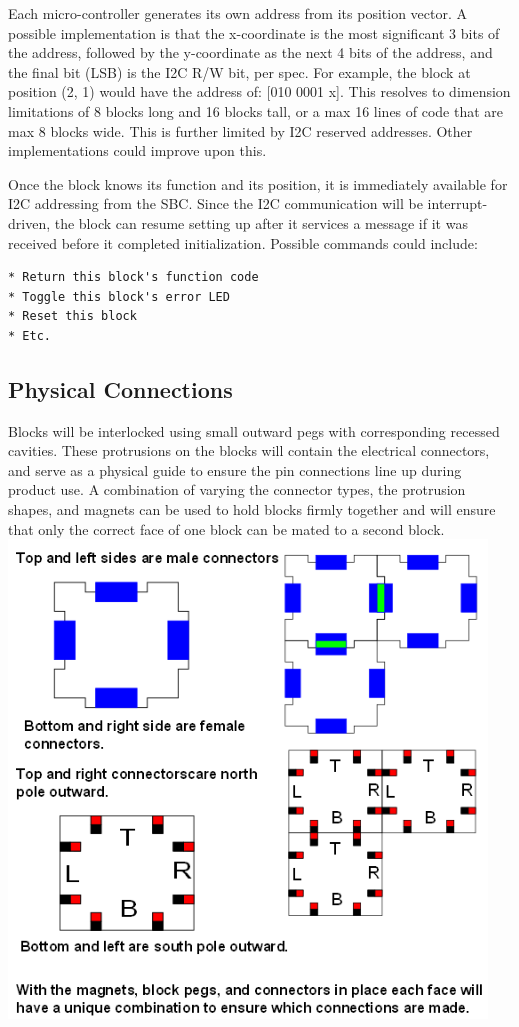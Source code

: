 Each micro-controller generates its own address from its position vector. A possible implementation is that the x-coordinate is the most significant 3 bits of the address, followed by the y-coordinate as the next 4 bits of the address, and the final bit (LSB) is the I2C R/W bit, per spec. For example, the block at position (2, 1) would have the address of: [010 0001 x]. This resolves to dimension limitations of 8 blocks long and 16 blocks tall, or a max 16 lines of code that are max 8 blocks wide. This is further limited by I2C reserved addresses. Other implementations could improve upon this.


Once the block knows its function and its position, it is immediately available for I2C addressing from the SBC. Since the I2C communication will be interrupt-driven, the block can resume setting up after it services a message if it was received before it completed initialization. Possible commands could include:
\begin{verbatim}
* Return this block's function code
* Toggle this block's error LED
* Reset this block
* Etc.
\end{verbatim}
   
\subsection{Physical Connections}
Blocks will be interlocked using small outward pegs with corresponding recessed cavities. These protrusions on the blocks will contain the electrical connectors, and serve as a physical guide to ensure the pin connections line up during product use. A combination of varying the connector types, the protrusion shapes, and magnets can be used to hold blocks firmly together and  will ensure that only the correct face of one block can be mated to a second block.\\
\includegraphics[width=5in]{Connector_scheme_Drawing}


